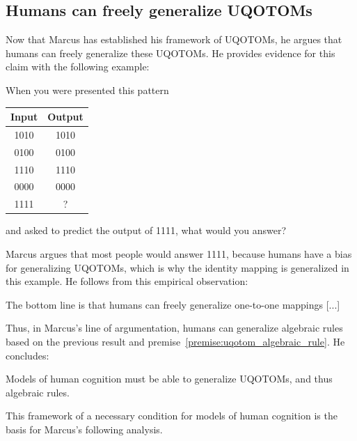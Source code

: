 \documentclass[../../main.tex]{subfiles}
\begin{document}
\subsection{Humans can freely generalize UQOTOMs}
Now that Marcus has established his framework of UQOTOMs, he argues that humans can freely generalize these UQOTOMs. He provides evidence for this claim with the following example:

\begin{example}
    When you were presented this pattern

        \begin{table}[h]
        \centering
        \begin{tabular}{c|c}
            Input & Output \\
            \hline
            1010 & 1010 \\
            0100 & 0100 \\
            1110 & 1110 \\
            0000 & 0000 \\
            1111 & ? \\
        \end{tabular}
    \end{table}
    and asked to predict the output of 1111, what would you answer?
\end{example}

Marcus argues that most people would answer 1111, because humans have a bias for generalizing UQOTOMs, which is why the identity mapping is generalized in this example. He follows from this empirical observation:

\begin{citecallout}
    \begin{premise}
        The bottom line is that humans can freely generalize one-to-one mappings [...]
    \end{premise}
\end{citecallout}

Thus, in Marcus's line of argumentation, humans can generalize algebraic rules based on the previous result and premise~\ref{premise:uqotom_algebraic_rule}. He concludes:

\begin{conclusion}
    Models of human cognition must be able to generalize UQOTOMs, and thus algebraic rules.
\end{conclusion}

This framework of a necessary condition for models of human cognition is the basis for Marcus's following analysis.
\end{document}
